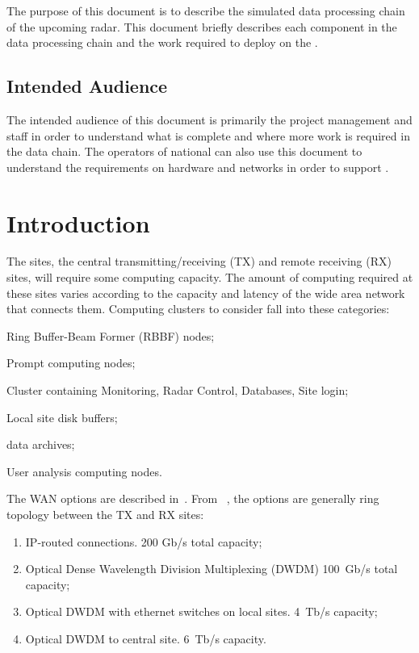\documentclass[12pt,a4paper]{article}
\begin{document}
The purpose of this document is to describe the simulated data processing chain of the upcoming \ED radar.
This document briefly describes each component in the data processing chain and the work required to deploy on the .

\subsection{Intended Audience}

The intended audience of this document is primarily the \ED project management and staff in order to understand what is complete and where more work is required in the data chain.
The operators of national  can also use this document to understand the requirements on hardware and networks in order to support \ED.

\section{Introduction}
\label{intro}

The \ED sites, the central transmitting/receiving (TX) and remote receiving (RX) sites, will require some computing capacity.
The amount of computing required at these sites varies according to the capacity and latency of the wide area network that connects them.
Computing clusters to consider fall into these categories:
\bitm
\item Ring Buffer-Beam Former (RBBF) nodes;
\item Prompt computing nodes;
\item Cluster containing Monitoring, Radar Control, Databases, Site login;
\item Local site disk buffers;
\item \ED data archives;
\item User analysis computing nodes.
\eitm

The WAN options are described in~\cite{wan-options}.
From ~\cite{wan-options}, the options are generally ring topology between the TX and RX sites:
\begin{enumerate}
\item IP-routed connections. 200 Gb/s total capacity;
\item Optical Dense Wavelength Division Multiplexing (DWDM) 100~Gb/s total capacity;
\item Optical DWDM with ethernet switches on local sites. 4~Tb/s capacity;
\item Optical DWDM to central site. 6~Tb/s capacity.
\end{enumerate}
\end{document}
